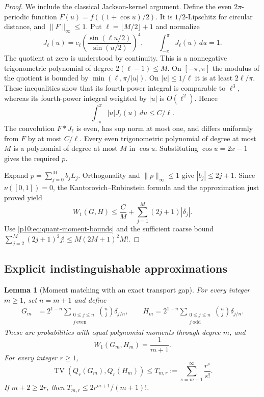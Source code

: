 \documentclass[11pt,letterpaper]{article}
\newtheorem{lemma}[theorem]{Lemma}
\theoremstyle{definition}
\theoremstyle{remark}
\newcommand{\1}{\mathbf 1}
\begin{document}
\begin{proof}
We include the classical Jackson-kernel argument.  Define the even
$2\pi$-periodic function $F(u)=f((1+\cos u)/2)$.  It is
$1/2$-Lipschitz for circular distance, and $\|F\|_\infty\le1$.
Put $\ell=\lfloor M/2\rfloor+1$ and normalize
\[
 J_\ell(u)=c_\ell
   \left(\frac{\sin(\ell u/2)}{\sin(u/2)}\right)^4,
 \qquad \int_{-\pi}^{\pi}J_\ell(u)\,du=1.
\]
The quotient at zero is understood by continuity.  This is a
nonnegative trigonometric polynomial of degree $2(\ell-1)\le M$.
On $[-\pi,\pi]$ the modulus of the quotient is bounded by
$\min(\ell,\pi/|u|)$.  On $|u|\le1/\ell$ it is at least
$2\ell/\pi$.  These inequalities show that its fourth-power integral
is comparable to $\ell^3$, whereas its fourth-power integral weighted
by $|u|$ is $O(\ell^2)$.  Hence
\[
 \int_{-\pi}^{\pi}|u|J_\ell(u)\,du\le C/\ell.
\]
The convolution $F*J_\ell$ is even, has sup norm at most one, and
differs uniformly from $F$ by at most $C/\ell$.  Every even
trigonometric polynomial of degree at most $M$ is a polynomial of
degree at most $M$ in $\cos u$.  Substituting $\cos u=2x-1$ gives
the required $p$.

Expand $p=\sum_{j=0}^M b_jL_j$.  Orthogonality and $\|p\|_\infty\le1$
give $|b_j|\le2j+1$.  Since $\nu([0,1])=0$, the
Kantorovich--Rubinstein formula and the approximation just proved yield
\[
 W_1(G,H)\le\frac C M+
       \sum_{j=1}^M(2j+1)|\delta_j|.
\]
Use \eqref{p10:eq:quant-moment-bounds} and the sufficient coarse bound
$\sum_{j=2}^M(2j+1)^2j!\le M(2M+1)^2M!$.
\end{proof}

\subsection{Explicit indistinguishable approximations}

\begin{lemma}[Moment matching with an exact transport gap]
\label{p10:lem:quant-binomial}
For every integer $m\ge1$, set $n=m+1$ and define
\begin{align*}
 G_m&=2^{1-n}\sum_{\substack{0\le j\le n\\j\ {\mathrm{even}}}}
          \binom nj\delta_{j/n},\qquad
 H_m=2^{1-n}\sum_{\substack{0\le j\le n\\j\ {\mathrm{odd}}}}
          \binom nj\delta_{j/n}.
\end{align*}
These are probabilities with equal polynomial moments through degree
$m$, and
\begin{equation}\label{p10:eq:quant-exact-transport}
 W_1(G_m,H_m)=\frac1{m+1}.
\end{equation}
For every integer $r\ge1$,
\begin{equation}\label{p10:eq:quant-factorial-tail}
 \operatorname{TV}(Q_r(G_m),Q_r(H_m))
 \le T_{m,r}:=\sum_{s=m+1}^{\infty}\frac{r^s}{s!}.
\end{equation}
If $m+2\ge2r$, then $T_{m,r}\le2r^{m+1}/(m+1)!$.
\end{lemma}
\end{document}
